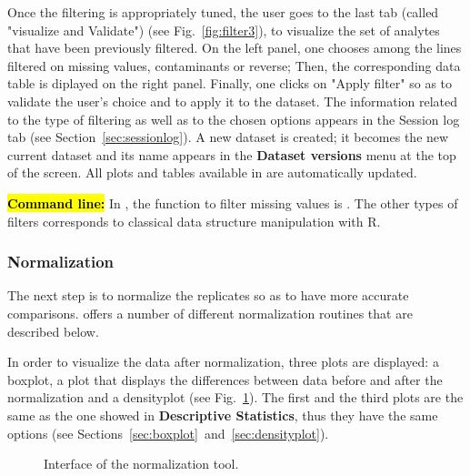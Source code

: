 \documentclass[12pt]{article}
\begin{document}
{{Once the filtering is appropriately tuned, the user goes to the last tab 
(called "visualize and Validate") (see Fig.~\ref{fig:filter3}), to visualize 
the set of analytes that have been previously filtered. On the left panel, 
one chooses among the lines filtered on missing values, contaminants or 
reverse; Then, the corresponding data table is diplayed on the right panel. 
Finally, one clicks on "Apply filter" so as to validate the user's choice and 
to apply it to the dataset. The information related to the type of filtering 
as well as to the chosen options appears in the Session log tab (see 
Section~\ref{sec:sessionlog}). A new dataset is created; it becomes the new 
current dataset and its name appears in the \textbf{Dataset versions} menu at 
the top of the screen. All plots and tables available in  
are automatically updated.}

\hl{\bf Command line:} In , the function to filter missing 
values is . The other types of filters corresponds to 
classical data structure manipulation with R.


\subsubsection{Normalization}\label{sec:normalization}

The next step is to normalize the replicates so as to have more accurate 
comparisons.  offers a number of different normalization 
routines that are described below.

In order to visualize the data after normalization, three plots are displayed:
a boxplot, a plot that displays the differences between data before and after 
the normalization and a densityplot (see Fig.~\ref{fig:norma}). The first and 
the third plots are the same as the one showed in \textbf{Descriptive 
Statistics}, thus they have the same options (see 
Sections~\ref{sec:boxplot}~and~\ref{sec:densityplot}).

\begin {figure}
\centering
{}
\caption{Interface of the normalization tool.}\label{fig:norma}
\end {figure}

}
\end{document}
